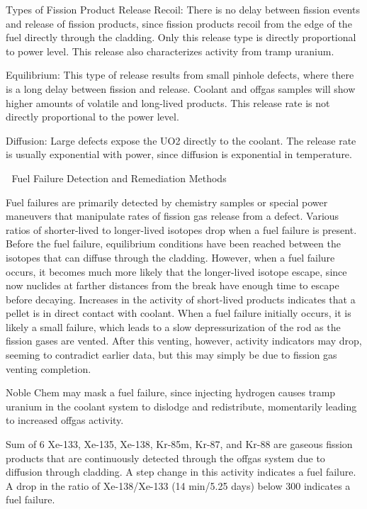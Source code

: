 \documentclass[10pt]{article}
\begin{document}
Types of Fission Product Release
Recoil: There is no delay between fission events and release of fission products, since fission products recoil from the edge of the fuel directly through the cladding. Only this release type is directly proportional to power level. This release also characterizes activity from tramp uranium. 

Equilibrium: This type of release results from small pinhole defects, where there is a long delay between fission and release. Coolant and offgas samples will show higher amounts of volatile and long-lived products. This release rate is not directly proportional to the power level. 

Diffusion: Large defects expose the UO2 directly to the coolant. The release rate is usually exponential with power, since diffusion is exponential in temperature. 



Fuel Failure Detection and Remediation Methods

Fuel failures are primarily detected by chemistry samples or special power maneuvers that manipulate rates of fission gas release from a defect. Various ratios of shorter-lived to longer-lived isotopes drop when a fuel failure is present. Before the fuel failure, equilibrium conditions have been reached between the isotopes that can diffuse through the cladding. However, when a fuel failure occurs, it becomes much more likely that the longer-lived isotope escape, since now nuclides at farther distances from the break have enough time to escape before decaying. Increases in the activity of short-lived products indicates that a pellet is in direct contact with coolant. When a fuel failure initially occurs, it is likely a small failure, which leads to a slow depressurization of the rod as the fission gases are vented. After this venting, however, activity indicators may drop, seeming to contradict earlier data, but this may simply be due to fission gas venting completion.

Noble Chem may mask a fuel failure, since injecting hydrogen causes tramp uranium in the coolant system to dislodge and redistribute, momentarily leading to increased offgas activity. 

Sum of 6
Xe-133, Xe-135, Xe-138, Kr-85m, Kr-87, and Kr-88 are gaseous fission products that are continuously detected through the offgas system due to diffusion through cladding. A step change in this activity indicates a fuel failure. A drop in the ratio of Xe-138/Xe-133 (14 min/5.25 days) below 300 indicates a fuel failure. 
\end{document}
